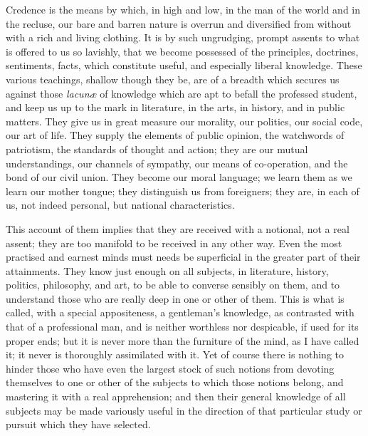 Credence is the means by which, in high and low, in the man of the
world and in the recluse, our bare and barren nature is overrun and
diversified from without with a rich and living clothing. It is by
such ungrudging, prompt assents to what is offered to us so lavishly,
that we become possessed of the principles, doctrines, sentiments,
facts, which constitute useful, and especially liberal knowledge.
These various teachings, shallow though they be, are of a breadth
which secures us against those \emph{lacunæ} of knowledge which are apt to
befall the professed student, and keep us up to the mark in
literature, in the arts, in history, and in public matters. They give
us in great measure our morality, our politics, our social code, our
art of life. They supply the elements of public opinion, the
watchwords of patriotism, the standards of thought and action; they
are our mutual understandings, our channels of sympathy, our means of
co-operation, and the bond of our civil union. They become our moral
language; we learn them as we learn our mother tongue; they
distinguish us from foreigners; they are, in each of us, not indeed
personal, but national characteristics.

This account of them implies that they are received with a
notional, not a real assent; they are too manifold to be received in
any other way. Even the most practised and earnest minds must
needs be superficial in the greater part of their attainments. They
know just enough on all subjects, in literature, history, politics,
philosophy, and art, to be able to converse sensibly on them, and to
understand those who are really deep in one or other of them. This is
what is called, with a special appositeness, a gentleman's knowledge,
as contrasted with that of a professional man, and is neither
worthless nor despicable, if used for its proper ends; but it is never
more than the furniture of the mind, as I have called it; it never is
thoroughly assimilated with it. Yet of course there is nothing to
hinder those who have even the largest stock of such notions from
devoting themselves to one or other of the subjects to which those
notions belong, and mastering it with a real apprehension; and then
their general knowledge of all subjects may be made variously useful
in the direction of that particular study or pursuit which they have
selected.

